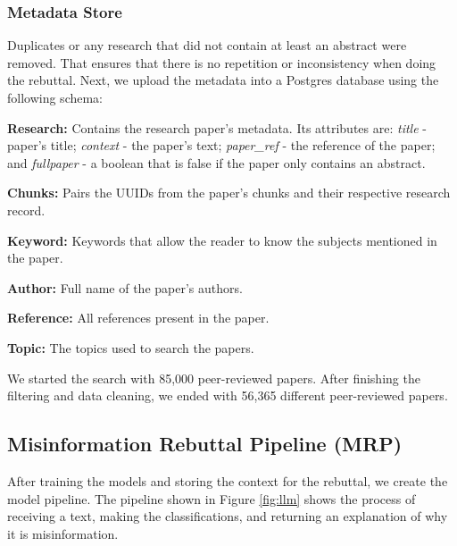 \subsubsection{Metadata Store}
Duplicates or any research that did not contain at least an abstract were removed. That ensures that there is no repetition or inconsistency when doing the rebuttal. Next, we upload the metadata into a Postgres database using the following schema:
\begin{description}
	\item{\textbf{Research:}}  Contains the research paper's metadata. Its attributes are: \textit{title} - paper's title; \textit{context} - the paper’s text; \textit{paper\_ref} - the reference of the paper; and \textit{fullpaper} - a boolean that is false if the paper only contains an abstract.
	\item{\textbf{Chunks:}} Pairs the UUIDs from the paper's chunks and their respective research record.  
	\item{\textbf{Keyword:}} Keywords that allow the reader to know the subjects mentioned in the paper. 
	\item{\textbf{Author:}} Full name of the paper's authors. 
	\item{\textbf{Reference:}} All references present in the paper.
	\item{\textbf{Topic:}} The topics used to search the papers.

\end{description}

We started the search with 85,000 peer-reviewed papers. After finishing the filtering and data cleaning, we ended with 56,365 different peer-reviewed papers. 


\subsection{Misinformation Rebuttal Pipeline (MRP)}
After training the models and storing the context for the rebuttal, we create the model pipeline. The pipeline shown in Figure \ref{fig:llm} shows the process of receiving a text, making the classifications, and returning an explanation of why it is misinformation.

